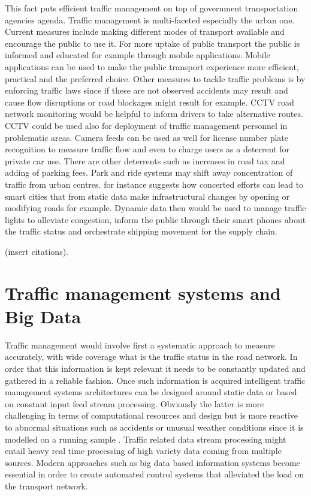 \documentclass[12pt, a4paper]{report}
\theoremstyle{definition}
\theoremstyle{definition}%
\theoremstyle{definition}%
\theoremstyle{definition}%
\theoremstyle{definition}%
\theoremstyle{definition}%
\begin{document}
This fact puts efficient traffic management on top of government transportation agencies agenda.
Traffic management is multi-faceted especially the urban one. Current measures include making different modes of transport available and encourage the public to use it. For more uptake of public transport the public is informed and educated for example through mobile applications.  Mobile applications can be used to make the public transport experience more efficient, practical and the preferred choice. Other measures to tackle traffic problems is by enforcing traffic laws since if these are not observed accidents may result and cause flow disruptions or road blockages might result for example. CCTV road network monitoring would be helpful to inform drivers to take alternative routes. CCTV could be used also for deployment of traffic management personnel in problematic areas. Camera feeds can be used as well for license number plate recognition to measure traffic flow and even to charge users as a deterrent for private car use. There are other deterrents such as increases in road tax and adding of parking fees. Park and ride systems may shift away concentration of traffic from urban centres.  \cite{AlNuaimi2015} for instance suggests how concerted efforts can lead to smart cities that from static data make infrastructural changes by opening or modifying roads for example. Dynamic data  then would be used to manage traffic lights to alleviate congestion, inform the public through their smart phones about the traffic status and orchestrate shipping movement for the supply chain.

(insert citations). 


\section{Traffic management systems and Big Data}

Traffic management would involve first a systematic approach to measure accurately, with wide coverage what is the traffic status in the road network. In order that this information is kept relevant it needs to be constantly updated and gathered in a reliable fashion. Once such information is acquired intelligent traffic management systems architectures can be designed around static data or based  on constant input feed stream processing. Obviously the latter is more challenging in terms of computational resources and design but is more reactive to abnormal situations such as accidents or unusual weather conditions since it is modelled on a running sample \cite{Toole2015}. Traffic related data stream processing might entail heavy real time processing of high variety data coming from multiple sources. Modern approaches such as big data based information systems become essential in order to create automated control systems that alleviated the load on the transport network.
\end{document}
